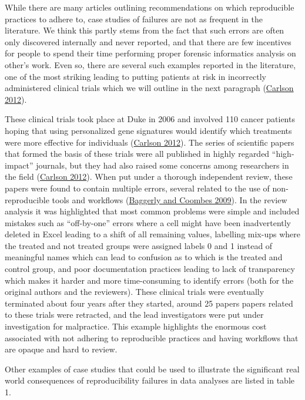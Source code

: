 \documentclass[
  12 pt,
]{paper}
\begin{document}
While there are many articles outlining recommendations
on which reproducible practices to adhere to,
case studies of failures are not as frequent in the literature.
We think this partly stems from the fact
that such errors are often only discovered internally and never reported,
and that there are few incentives for people
to spend their time performing proper forensic informatics analysis on other's work.
Even so,
there are several such examples reported in the literature,
one of the most striking leading to putting patients at risk
in incorrectly administered clinical trials
which we will outline in the next paragraph (\protect\hyperlink{ref-carlson_carlson_2012}{Carlson 2012}).

These clinical trials took place at Duke in 2006
and involved 110 cancer patients
hoping that using personalized gene signatures
would identify which treatments were more effective for individuals (\protect\hyperlink{ref-carlson_carlson_2012}{Carlson 2012}).
The series of scientific papers that formed the basis of these trials
were all published in highly regarded ``high-impact'' journals,
but they had also raised some concerns among researchers in the field (\protect\hyperlink{ref-carlson_carlson_2012}{Carlson 2012}).
When put under a thorough independent review,
these papers were found to contain multiple errors,
several related to the use of non-reproducible tools
and workflows (\protect\hyperlink{ref-baggerly2009deriving}{Baggerly and Coombes 2009}).
In the review analysis it was highlighted that most common problems were simple
and included mistakes such as ``off-by-one'' errors
where a cell might have been inadvertently deleted in Excel
leading to a shift of all remaining values,
labelling mix-ups where the treated and not treated groups
were assigned labels 0 and 1 instead of meaningful names
which can lead to confusion as to which is the treated and control group,
and poor documentation practices leading to lack of transparency
which makes it harder and more time-consuming to identify errors
(both for the original authors and the reviewers).
These clinical trials were eventually terminated about four years after they started,
around 25 papers papers related to these trials were retracted,
and the lead investigators were put under investigation for malpractice.
This example highlights the enormous cost
associated with not adhering to reproducible practices
and having workflows that are opaque and hard to review.

Other examples of case studies that could be used to illustrate the significant
real world consequences of reproducibility failures in data analyses
are listed in table 1.
\end{document}
